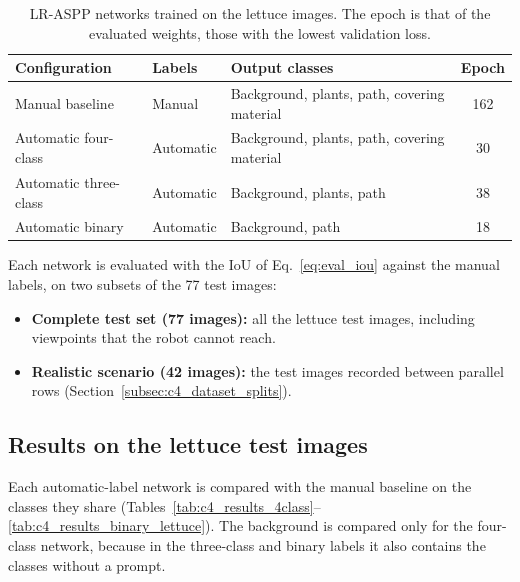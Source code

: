 \begin{table}[!htb]
    \centering
    \small
    \caption{LR-ASPP networks trained on the lettuce images. The epoch is that of the evaluated weights, those with the lowest validation loss.}
    \label{tab:c4_supervision_configurations}
    \begin{tabularx}{\textwidth}{@{}l l >{\raggedright\arraybackslash}X S[table-format=3.0]@{}}
        \toprule
        Configuration & Labels & Output classes & {Epoch} \\
        \midrule
        Manual baseline & Manual & Background, plants, path, covering material & 162 \\
        Automatic four-class & Automatic & Background, plants, path, covering material & 30 \\
        Automatic three-class & Automatic & Background, plants, path & 38 \\
        Automatic binary & Automatic & Background, path & 18 \\
        \bottomrule
    \end{tabularx}
\end{table}

Each network is evaluated with the IoU of Eq.~\eqref{eq:eval_iou} against the manual labels, on two subsets of the 77 test images:
\begin{itemize}
    \item \textbf{Complete test set (77 images):} all the lettuce test images, including viewpoints that the robot cannot reach.
    \item \textbf{Realistic scenario (42 images):} the test images recorded between parallel rows (Section~\ref{subsec:c4_dataset_splits}).
\end{itemize}

\subsection{Results on the lettuce test images}
\label{subsec:c4_supervision_results}

Each automatic-label network is compared with the manual baseline on the classes they share (Tables~\ref{tab:c4_results_4class}--\ref{tab:c4_results_binary_lettuce}). The background is compared only for the four-class network, because in the three-class and binary labels it also contains the classes without a prompt.

